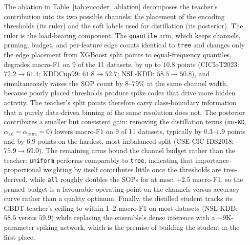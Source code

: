 The ablation in Table~\ref{tab:encoder_ablation} decomposes the teacher's
contribution into its two possible channels: the placement of the encoding
thresholds (its ruler) and the soft labels used for distillation (its
posterior). The ruler is the load-bearing component. The \texttt{quantile}
arm, which keeps channels, pruning, budget, and per-feature edge counts
identical to \texttt{tree} and changes only the edge placement from XGBoost
split points to equal-frequency quantiles, degrades macro-F1 on 9 of the 11
datasets, by up to $10.8$ points (CICIoT2023: $72.2 \rightarrow 61.4$;
KDDCup99: $61.8 \rightarrow 52.7$; NSL-KDD: $58.5 \rightarrow 50.8$), and
simultaneously raises the SOP count by $8$--$79\%$ at the same channel width,
because poorly placed thresholds produce spike codes that drive more hidden
activity. The teacher's split points therefore carry class-boundary
information that a purely data-driven binning of the same resolution does not.
The posterior contributes a smaller but consistent gain: removing the
distillation terms (\texttt{no-KD}, $\alpha_{\mathrm{kd}} =
\alpha_{\mathrm{rank}} = 0$) lowers macro-F1 on 9 of 11 datasets, typically by
$0.3$--$1.9$ points and by $6.9$ points on the hardest, most imbalanced split
(CSE-CIC-IDS2018: $75.9 \rightarrow 69.0$). The remaining arms bound the
channel budget rather than the teacher: \texttt{uniform} performs comparably
to \texttt{tree}, indicating that importance-proportional weighting by itself
contributes little once the thresholds are tree-derived, while \texttt{all}
roughly doubles the SOPs for at most $+2.5$ macro-F1, so the pruned budget is
a favourable operating point on the channels-versus-accuracy curve rather
than a quality optimum. Finally, the distilled student tracks its GBDT
teacher's ceiling to within $1$--$2$ macro-F1 on most datasets (NSL-KDD:
$58.5$ versus $59.9$) while replacing the ensemble's dense inference with a
$\sim$9K-parameter spiking network, which is the premise of building the
student in the first place.
